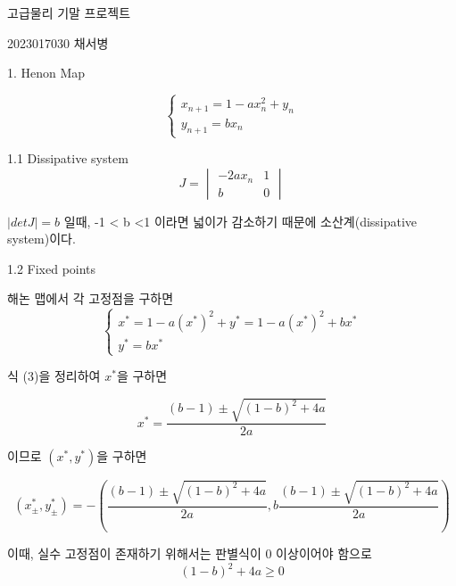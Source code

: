 \documentclass[10pt]{article}
\begin{document}
\begin{center}
고급물리 기말 프로젝트
\end{center}

\begin{flushright}
2023017030 채서병
\end{flushright}

1. Henon Map

\begin{equation}
\begin{cases}
x_{n+1}=1-a x_n^2+y_n\\
y_{n+1}=b x_{n}
\end{cases}
\end{equation}

\vspace{1em}

1.1 Dissipative system 
\begin{equation}
J = \begin{vmatrix}
    -2ax_n & 1 \\ b & 0
\end{vmatrix}
\end{equation}

\(|det J| = b\) 일때, -1 < b <1 이라면 넓이가 감소하기 때문에 소산계(dissipative system)이다.

\vspace{1em}

1.2 Fixed points

해논 맵에서 각 고정점을 구하면
\begin{equation}
    \begin{cases}
        x^* = 1-a (x^*)^2 + y^* = 1 - a (x^*)^2 + b x^*\\
        y^* = b x^*
    \end{cases}
\end{equation}

식 (3)을 정리하여 \(x^*\)을 구하면

\begin{equation}
    x^* = \frac{(b-1) \pm \sqrt{(1-b)^2 + 4a}}{2a}
\end{equation}

이므로 \((x^*, y^*)\)을 구하면

\begin{equation}
    (x^*_{\pm}, y^*_{\pm}) =-(\frac{(b-1) \pm \sqrt{(1-b)^2 + 4a}}{2a}, b\frac{(b-1) \pm \sqrt{(1-b)^2 + 4a}}{2a})
\end{equation}

이때, 실수 고정점이 존재하기 위해서는 판별식이 0 이상이어야 함으로
\begin{equation}
    (1-b)^2 + 4a \ge 0
\end{equation}
\end{document}
